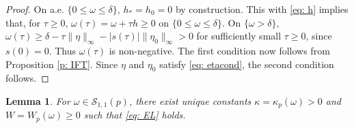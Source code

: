 \documentclass[11pt]{amsart}
\newtheorem{lemma}[theorem]{Lemma}
\theoremstyle{definition}
\theoremstyle{definition}
\numberwithin{equation}{section}
\newcommand{\0}{\emptyset}
\newcommand{\calS}{\mathcal S}
\begin{document}
        
\begin{proof}
    {On a.e. $\{0 \le \omega \le \delta\}$, $h_* = h_0 = 0$ by construction.
    This with \eqref{eq: h} implies that, for $\tau \ge 0$, $\omega(\tau) = \omega + \tau h \ge 0$ on $\{0 \le \omega \le \delta\}$.}
    On $\{\omega > \delta\}$, $\omega(\tau) \ge \delta - \tau \|\eta\|_\infty - |s(\tau)| \|\eta_0\|_\infty > 0$ for sufficiently small $\tau \ge0$, since $s(0)=0$.
    Thus $\omega(\tau)$ is non-negative.
    The first condition now follows from Proposition \ref{p: IFT}.
    Since $\eta$ and $\eta_0$ satisfy \eqref{eq: etacond}, the second condition follows.
\end{proof}
		
		
		\begin{lemma}\label{prop_representation}
			For $\omega \in \calS_{1,1}(p)$, 
			there exist unique constants $\kappa=\kappa_p(\omega)>0$ and $W=W_p(\omega)\ge0$ such that \eqref{eq: EL} holds.
		\end{lemma}
		
\end{document}
